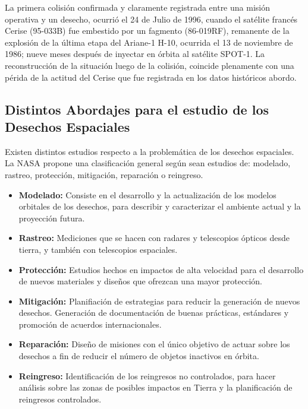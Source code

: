 La primera colisi\'on confirmada y claramente registrada entre una misi\'on operativa y un desecho, ocurri\'o el 24 de Julio de 1996, cuando el sat\'elite franc\'es Cerise (95-033B) fue embestido por un fagmento (86-019RF), remanente de la explosi\'on de la \'ultima etapa del Ariane-1 H-10, ocurrida el 13 de noviembre de 1986; nueve meses despu\'es de inyectar en \'orbita al sat\'elite SPOT-1. La reconstrucci\'on de la situaci\'on luego de la colisi\'on, coincide plenamente con una p\'erida de la actitud del Cerise que fue registrada en los datos hist\'oricos abordo. \citep{KlinkradChapter8}\\

\subsection*{Distintos Abordajes para el estudio de los Desechos Espaciales}
Existen distintos estudios respecto a la problem\'atica de los desechos espaciales. La \ac{NASA} propone una clasificaci\'on general seg\'un sean estudios de: modelado, rastreo, protecci\'on, mitigaci\'on, reparaci\'on o reingreso.\\
\begin{itemize}
\item {\bf{Modelado:}} Consiste en el desarrollo y la actualizaci\'on de los modelos orbitales de los desechos, para describir y caracterizar el ambiente actual y la proyecci\'on futura.\\
\item {\bf{Rastreo:}} Mediciones que se hacen con radares y telescopios \'opticos desde tierra, y tambi\'en con telescopios espaciales.\\
\item {\bf{Protecci\'on:}} Estudios hechos en impactos de alta velocidad para el desarrollo de nuevos materiales y dise\~nos que ofrezcan una mayor protecci\'on.\\
\item {\bf{Mitigaci\'on:}} Planifiaci\'on de estrategias para reducir la generaci\'on de nuevos desechos. Generaci\'on de documentaci\'on  de buenas pr\'acticas, est\'andares y promoci\'on de acuerdos internacionales.\\
\item {\bf{Reparaci\'on:}} Dise\~no de misiones con el \'unico objetivo de actuar sobre los desechos a fin de reducir el n\'umero de objetos inactivos en \'orbita.\\
\item {\bf{Reingreso:}} Identificaci\'on de los reingresos no controlados, para hacer an\'alisis sobre las zonas de posibles impactos en Tierra y la planificaci\'on de reingresos controlados.\\
\end{itemize}

